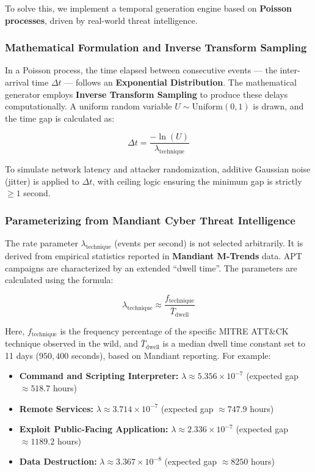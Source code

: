 To solve this, we implement a temporal generation engine based on \textbf{Poisson processes}, driven by real-world threat intelligence.

\subsubsection{Mathematical Formulation and Inverse Transform Sampling}

In a Poisson process, the time elapsed between consecutive events --- the inter-arrival time $\Delta t$ --- follows an \textbf{Exponential Distribution}. The mathematical generator employs \textbf{Inverse Transform Sampling} to produce these delays computationally. A uniform random variable $U \sim \text{Uniform}(0,1)$ is drawn, and the time gap is calculated as:

\begin{equation}
    \Delta t = \frac{-\ln(U)}{\lambda_{\text{technique}}}
\end{equation}

To simulate network latency and attacker randomization, additive Gaussian noise (jitter) is applied to $\Delta t$, with ceiling logic ensuring the minimum gap is strictly $\ge 1$ second.

\subsubsection{Parameterizing from Mandiant Cyber Threat Intelligence}

The rate parameter $\lambda_{\text{technique}}$ (events per second) is not selected arbitrarily. It is derived from empirical statistics reported in \textbf{Mandiant M-Trends} data. APT campaigns are characterized by an extended ``dwell time''. The parameters are calculated using the formula:

\begin{equation}
    \lambda_{\text{technique}} \approx \frac{f_{\text{technique}}}{\bar{T}_{\text{dwell}}}
\end{equation}

Here, $f_{\text{technique}}$ is the frequency percentage of the specific MITRE ATT\&CK technique observed in the wild, and $\bar{T}_{\text{dwell}}$ is a median dwell time constant set to 11 days ($950,400$ seconds), based on Mandiant reporting. For example:
\begin{itemize}
    \item \textbf{Command and Scripting Interpreter:} $\lambda \approx 5.356 \times 10^{-7}$ (expected gap $\approx 518.7$ hours)
    \item \textbf{Remote Services:} $\lambda \approx 3.714 \times 10^{-7}$ (expected gap $\approx 747.9$ hours)
    \item \textbf{Exploit Public-Facing Application:} $\lambda \approx 2.336 \times 10^{-7}$ (expected gap $\approx 1189.2$ hours)
    \item \textbf{Data Destruction:} $\lambda \approx 3.367 \times 10^{-8}$ (expected gap $\approx 8250$ hours)
\end{itemize}

